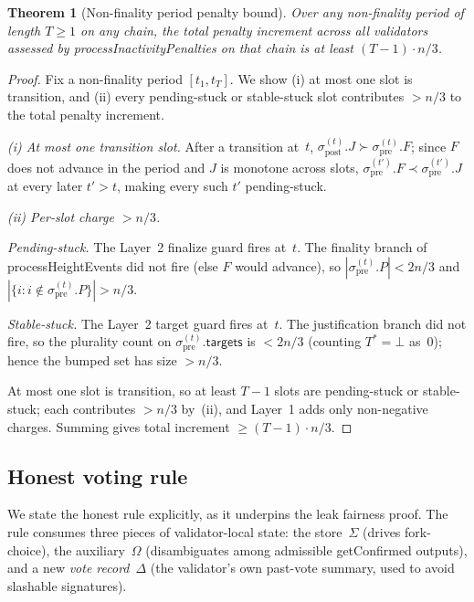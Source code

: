 \documentclass{article}
\newcommand{\targets}{\mathsf{targets}}
\newcommand{\processHeightEvents}{\textsf{processHeightEvents}\xspace}
\newcommand{\processInactivityPenalties}{\textsf{processInactivityPenalties}\xspace}
\newcommand{\getConfirmed}{\textsf{getConfirmed}\xspace}
\theoremstyle{plain}
\newtheorem{theorem}{Theorem}
\theoremstyle{definition}
\theoremstyle{remark}
\begin{document}
\begin{theorem}[Non-finality period penalty bound]\label{thm:tightness}
Over any non-finality period of length $T \geq 1$ on any chain, the total penalty increment across all validators assessed by \processInactivityPenalties on that chain is at least $(T - 1) \cdot n/3$.
\end{theorem}

\begin{proof}
Fix a non-finality period $[t_1, t_T]$.
We show (i) at most one slot is transition, and (ii) every pending-stuck or stable-stuck slot contributes $> n/3$ to the total penalty increment.

\emph{(i) At most one transition slot.}
After a transition at~$t$, $\sigma_{\mathrm{post}}^{(t)}.J \succ \sigma_{\mathrm{pre}}^{(t)}.F$; since $F$ does not advance in the period and $J$ is monotone across slots, $\sigma_{\mathrm{pre}}^{(t')}.F \prec \sigma_{\mathrm{pre}}^{(t')}.J$ at every later $t' > t$, making every such $t'$ pending-stuck.

\emph{(ii) Per-slot charge $> n/3$.}

\emph{Pending-stuck.} The Layer~2 finalize guard fires at~$t$.
The finality branch of \processHeightEvents did not fire (else $F$ would advance), so $|\sigma_{\mathrm{pre}}^{(t)}.P| < 2n/3$ and $|\{i : i \notin \sigma_{\mathrm{pre}}^{(t)}.P\}| > n/3$.

\emph{Stable-stuck.} The Layer~2 target guard fires at~$t$.
The justification branch did not fire, so the plurality count on $\sigma_{\mathrm{pre}}^{(t)}.\targets$ is $< 2n/3$ (counting $T^* = \bot$ as~$0$); hence the bumped set has size $> n/3$.

At most one slot is transition, so at least $T - 1$ slots are pending-stuck or stable-stuck; each contributes $> n/3$ by~(ii), and Layer~1 adds only non-negative charges.
Summing gives total increment $\geq (T-1) \cdot n/3$.
\end{proof}

\subsection{Honest voting rule}

We state the honest rule explicitly, as it underpins the leak fairness proof.
The rule consumes three pieces of validator-local state: the store~$\Sigma$ (drives fork-choice), the auxiliary~$\Omega$ (disambiguates among admissible \getConfirmed outputs), and a new \emph{vote record}~$\Delta$ (the validator's own past-vote summary, used to avoid slashable signatures).
\end{document}
